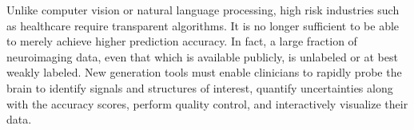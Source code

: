 Unlike computer vision or natural language processing, high risk industries such as healthcare require transparent algorithms. It is no longer sufficient to be able to merely achieve higher prediction accuracy. In fact, a large fraction of neuroimaging data, even that which is available publicly, is unlabeled or at best weakly labeled. New generation tools must enable clinicians to rapidly probe the brain to identify signals and structures of interest, quantify uncertainties along with the accuracy scores, perform quality control, and interactively visualize their data.
